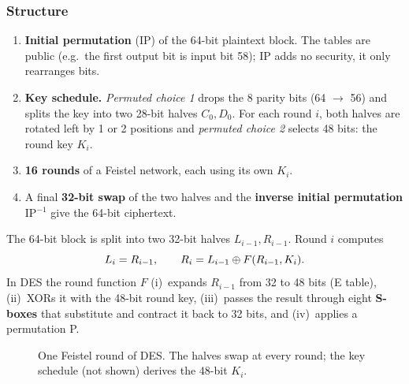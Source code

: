 \subsubsection{Structure}
\begin{enumerate}
    \item \textbf{Initial permutation} (IP) of the 64-bit plaintext block. The tables are public (e.g.\ the first output bit is input bit 58); IP adds no security, it only rearranges bits.
    \item \textbf{Key schedule.} \emph{Permuted choice 1} drops the 8 parity bits (64 $\to$ 56) and splits the key into two 28-bit halves $C_0, D_0$. For each round $i$, both halves are rotated left by 1 or 2 positions and \emph{permuted choice 2} selects 48 bits: the round key $K_i$.
    \item \textbf{16 rounds} of a Feistel network, each using its own $K_i$.
    \item A final \textbf{32-bit swap} of the two halves and the \textbf{inverse initial permutation} IP$^{-1}$ give the 64-bit ciphertext.
\end{enumerate}

\begin{definition}
The 64-bit block is split into two 32-bit halves $L_{i-1}, R_{i-1}$. Round $i$ computes
\[
    L_i = R_{i-1}, \qquad R_i = L_{i-1} \oplus F(R_{i-1}, K_i).
\]
In DES the round function $F$ (i)~expands $R_{i-1}$ from 32 to 48 bits (E table), (ii)~XORs it with the 48-bit round key, (iii)~passes the result through eight \textbf{S-boxes} that substitute and contract it back to 32 bits, and (iv)~applies a permutation P.
\end{definition}

\begin{figure}[H]
\centering
{}
\caption{One Feistel round of DES. The halves swap at every round; the key schedule (not shown) derives the 48-bit $K_i$.}
\label{fig:feistel}
\end{figure}

